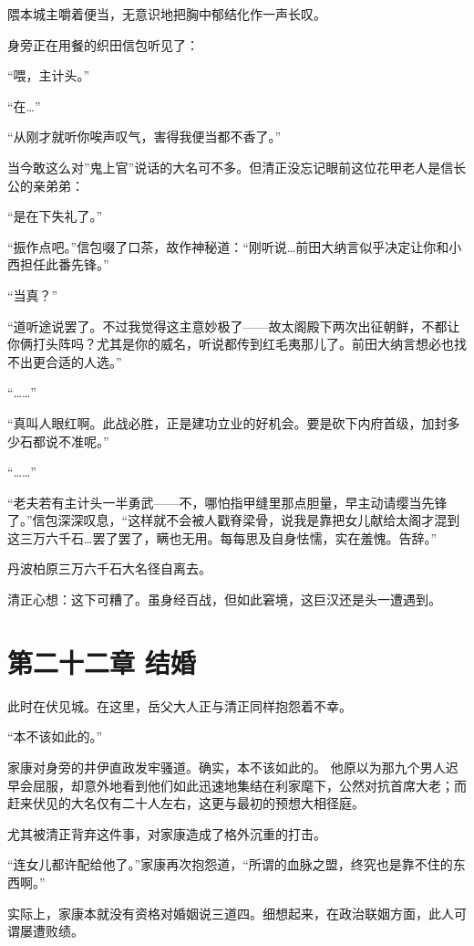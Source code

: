 \documentclass[
]{article}
\begin{document}
隈本城主嚼着便当，无意识地把胸中郁结化作一声长叹。

身旁正在用餐的织田信包听见了：

``喂，主计头。''

``在\ldots{}''

``从刚才就听你唉声叹气，害得我便当都不香了。''

当今敢这么对''鬼上官''说话的大名可不多。但清正没忘记眼前这位花甲老人是信长公的亲弟弟：

``是在下失礼了。''

``振作点吧。''信包啜了口茶，故作神秘道：``刚听说\ldots 前田大纳言似乎决定让你和小西担任此番先锋。''

``当真？''

``道听途说罢了。不过我觉得这主意妙极了------故太阁殿下两次出征朝鲜，不都让你俩打头阵吗？尤其是你的威名，听说都传到红毛夷那儿了。前田大纳言想必也找不出更合适的人选。''

``\ldots\ldots{}''

``真叫人眼红啊。此战必胜，正是建功立业的好机会。要是砍下内府首级，加封多少石都说不准呢。''

``\ldots\ldots{}''

``老夫若有主计头一半勇武------不，哪怕指甲缝里那点胆量，早主动请缨当先锋了。''信包深深叹息，``这样就不会被人戳脊梁骨，说我是靠把女儿献给太阁才混到这三万六千石\ldots 罢了罢了，瞒也无用。每每思及自身怯懦，实在羞愧。告辞。''

丹波柏原三万六千石大名径自离去。

清正心想：这下可糟了。虽身经百战，但如此窘境，这巨汉还是头一遭遇到。

\section*{第二十二章 结婚}\label{ux7b2cux4e8cux5341ux4e8cux7ae0-ux7ed3ux5a5a}

此时在伏见城。在这里，岳父大人正与清正同样抱怨着不幸。

``本不该如此的。''

家康对身旁的井伊直政发牢骚道。确实，本不该如此的。 他原以为那九个男人迟早会屈服，却意外地看到他们如此迅速地集结在利家麾下，公然对抗首席大老；而赶来伏见的大名仅有二十人左右，这更与最初的预想大相径庭。

尤其被清正背弃这件事，对家康造成了格外沉重的打击。

``连女儿都许配给他了。''家康再次抱怨道，``所谓的血脉之盟，终究也是靠不住的东西啊。''

实际上，家康本就没有资格对婚姻说三道四。细想起来，在政治联姻方面，此人可谓屡遭败绩。
\end{document}
